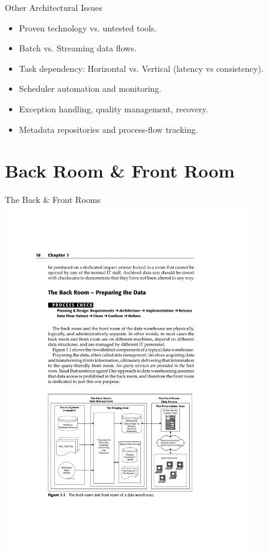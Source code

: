 \documentclass[aspectratio=169]{beamer}
\begin{document}
\begin{frame}{Other Architectural Issues}
    \begin{itemize}
        \item Proven technology vs. untested tools.
        \item Batch vs. Streaming data flows.
        \item Task dependency: Horizontal vs. Vertical (latency vs consistency).
        \item Scheduler automation and monitoring.
        \item Exception handling, quality management, recovery.
        \item Metadata repositories and process-flow tracking.
    \end{itemize}
\end{frame}

\section{Back Room \& Front Room}

\begin{frame}{The Back \& Front Rooms}
    \centering
    \includegraphics[width=0.8\textwidth, trim={3.5cm 4.55cm 3.5cm 16cm}, clip]{figures/rooms}
\end{frame}
\end{document}
